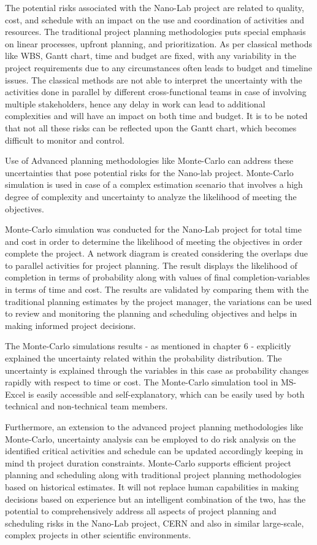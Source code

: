 \begin{SingleSpace}
The potential risks associated with the Nano-Lab project are related to quality, cost, and schedule with an impact on the use and coordination of activities and resources. The traditional project planning methodologies puts special emphasis on linear processes, upfront planning, and prioritization. As per classical methods like WBS, Gantt chart, time and budget are fixed, with any variability in the project requirements due to any circumstances often leads to budget and timeline issues. The classical methods are not able to interpret the uncertainty with the activities done in parallel by different cross-functional teams in case of involving multiple stakeholders, hence any delay in work can lead to additional complexities and will have an impact on both time and budget. It is to be noted that not all these risks can be reflected upon the Gantt chart, which becomes difficult to monitor and control.

Use of Advanced planning methodologies like Monte-Carlo can address these uncertainties that pose potential risks for the Nano-lab project. Monte-Carlo simulation is used in case of a complex estimation scenario that involves a high degree of complexity and uncertainty to analyze the likelihood of meeting the objectives.

Monte-Carlo simulation was conducted for the Nano-Lab project for total time and cost in order to determine the likelihood of meeting the objectives in order complete the project. A network diagram is created considering the overlaps due to parallel activities for project planning. The result displays the likelihood of completion in terms of probability along with values of final completion-variables in terms of time and cost. The results are validated by comparing them with the traditional planning estimates by the project manager, the variations can be used to review and monitoring the planning and scheduling objectives and helps in making informed project decisions.

The Monte-Carlo simulations results - as mentioned in chapter 6 - explicitly explained the uncertainty related within the probability distribution. The uncertainty is explained through the variables in this case as probability changes rapidly with respect to time or cost. The Monte-Carlo simulation tool in MS-Excel is easily accessible and self-explanatory, which can be easily used by both technical and non-technical team members. 

Furthermore, an extension to the advanced project planning methodologies like Monte-Carlo, uncertainty analysis can be employed to do risk analysis on the identified critical activities and schedule can be updated accordingly keeping in mind th project duration constraints. Monte-Carlo supports efficient project planning and scheduling along with traditional project planning methodologies based on historical estimates. It will not replace human capabilities in making decisions based on experience but an intelligent combination of the two, has the potential to comprehensively address all aspects of project planning and scheduling risks in the Nano-Lab project, CERN and also in similar large-scale, complex projects in other scientific environments.



\end{SingleSpace}
\clearpage